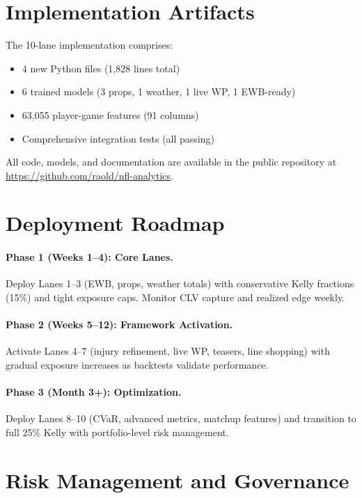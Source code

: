 \section{Implementation Artifacts}

The 10-lane implementation comprises:
\begin{itemize}
  \item 4 new Python files (1,828 lines total)
  \item 6 trained models (3 props, 1 weather, 1 live WP, 1 EWB-ready)
  \item 63,055 player-game features (91 columns)
  \item Comprehensive integration tests (all passing)
\end{itemize}

All code, models, and documentation are available in the public repository at \url{https://github.com/raold/nfl-analytics}.

\section{Deployment Roadmap}

\paragraph{Phase 1 (Weeks 1--4): Core Lanes.}
Deploy Lanes 1--3 (EWB, props, weather totals) with conservative Kelly fractions (15\%) and tight exposure caps. Monitor CLV capture and realized edge weekly.

\paragraph{Phase 2 (Weeks 5--12): Framework Activation.}
Activate Lanes 4--7 (injury refinement, live WP, teasers, line shopping) with gradual exposure increases as backtests validate performance.

\paragraph{Phase 3 (Month 3+): Optimization.}
Deploy Lanes 8--10 (CVaR, advanced metrics, matchup features) and transition to full 25\% Kelly with portfolio-level risk management.

\section{Risk Management and Governance}

